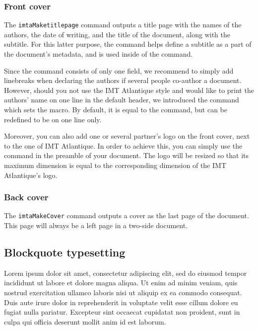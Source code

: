 \documentclass{report}
\begin{document}
\subsubsection{Front cover}
The \texttt{imtaMaketitlepage} command outputs a title page with the names of the authors, the date of writing, and the title of the document, along with the subtitle.
For this latter purpose, the  command helps define a subtitle as a part of the document's metadata, and %
is used inside of the  command.

Since the  command consists of only one field, we recommend to simply add linebreaks when declaring the authors if several people co-author a document. However, should you not use the IMT Atlantique style and would like to print the authors' name on one line in the default header, we introduced the  command which sets the  macro. By default, it is equal to the  command, but can be redefined to be on one line only.

Moreover, you can also add one or several partner's logo on the front cover, next to the one of IMT Atlantique. In order to achieve this, you can simply use the  command in the preamble of your document. The logo will be resized so that its maximum dimension is equal to the corresponding dimension of the IMT Atlantique's logo.


\subsubsection{Back cover}

The \texttt{imtaMakeCover} command outputs a cover as the last page of the document.
This page will always be a left page in a two-side document.


\subsection{Blockquote typesetting}

\begin{imtaQuote}
Lorem ipsum dolor sit amet, consectetur adipiscing elit, sed do eiusmod tempor incididunt ut labore et dolore magna aliqua. 
Ut enim ad minim veniam, quis nostrud exercitation ullamco laboris nisi ut aliquip ex ea commodo consequat. 
Duis aute irure dolor in reprehenderit in voluptate velit esse cillum dolore eu fugiat nulla pariatur.
Excepteur sint occaecat cupidatat non proident, sunt in culpa qui officia deserunt mollit anim id est laborum.
\end{imtaQuote}
\end{document}
